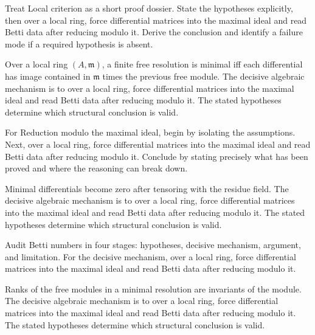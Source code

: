 \begin{problem}\label{prob:v25-problem-02}
Treat Local criterion as a short proof dossier. State the hypotheses explicitly, then over a local ring, force differential matrices into the maximal ideal and read Betti data after reducing modulo it. Derive the conclusion and identify a failure mode if a required hypothesis is absent.
\end{problem}
\begin{solution}
Over a local ring $(A,\mathfrak m)$, a finite free resolution is minimal iff each differential has image contained in $\mathfrak m$ times the previous free module. The decisive algebraic mechanism is to over a local ring, force differential matrices into the maximal ideal and read Betti data after reducing modulo it. The stated hypotheses determine which structural conclusion is valid.
\end{solution}

\begin{problem}\label{prob:v25-problem-03}
For Reduction modulo the maximal ideal, begin by isolating the assumptions. Next, over a local ring, force differential matrices into the maximal ideal and read Betti data after reducing modulo it. Conclude by stating precisely what has been proved and where the reasoning can break down.
\end{problem}
\begin{solution}
Minimal differentials become zero after tensoring with the residue field. The decisive algebraic mechanism is to over a local ring, force differential matrices into the maximal ideal and read Betti data after reducing modulo it. The stated hypotheses determine which structural conclusion is valid.
\end{solution}

\begin{problem}\label{prob:v25-problem-04}
Audit Betti numbers in four stages: hypotheses, decisive mechanism, argument, and limitation. For the decisive mechanism, over a local ring, force differential matrices into the maximal ideal and read Betti data after reducing modulo it.
\end{problem}
\begin{solution}
Ranks of the free modules in a minimal resolution are invariants of the module. The decisive algebraic mechanism is to over a local ring, force differential matrices into the maximal ideal and read Betti data after reducing modulo it. The stated hypotheses determine which structural conclusion is valid.
\end{solution}

